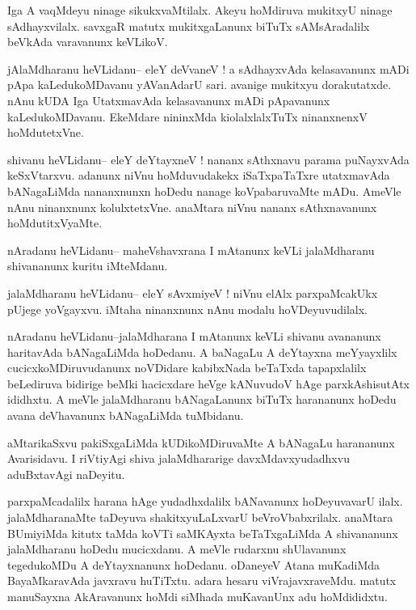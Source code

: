 \documentclass{article}
\begin{document}
\begin{mn}%
Iga A vaqMdeyu ninage sikukxvaMtilalx. Akeyu hoMdiruva mukitxyU ninage sAdhayxvilalx. 
savxgaR matutx mukitxgaLanunx biTuTx sAMsAradalilx beVkAda varavanunx keVLikoV.
\end{mn}

\begin{mn}%
jAlaMdharanu heVLidanu-- eleY deVvaneV ! a sAdhayxvAda kelasavanunx mADi pApa 
kaLedukoMDavanu yAVanAdarU sari. avanige mukitxyu dorakutatxde. nAnu kUDA Iga UtatxmavAda 
kelasavanunx mADi pApavanunx kaLedukoMDavanu. EkeMdare nininxMda kiolalxlalxTuTx 
ninanxnenxV hoMdutetxVne.
\end{mn}

\begin{mn}%
shivanu heVLidanu-- eleY deYtayxneV ! nananx sAthxnavu parama puNayxvAda keSxVtarxvu. 
adanunx niVnu hoMduvudakekx iSaTxpaTaTxre utatxmavAda bANagaLiMda nananxnunxn hoDedu nanage 
koVpabaruvaMte mADu. AmeVle nAnu ninanxnunx kolulxtetxVne. anaMtara niVnu nananx 
sAthxnavanunx hoMdutitxVyaMte.
\end{mn}

\begin{mn}%
nAradanu heVLidanu-- maheVshavxrana I mAtanunx keVLi jalaMdharanu shivananunx kuritu iMteMdanu.
\end{mn}

\begin{mn}%
jalaMdharanu heVLidanu-- eleY sAvxmiyeV ! niVnu elAlx parxpaMcakUkx pUjege yoVgayxvu. iMtaha 
ninanxnunx nAnu modalu hoVDeyuvudilalx.
\end{mn}

\begin{mn}%
nAradanu heVLidanu--jalaMdharana I mAtanunx keVLi shivanu avananunx haritavAda bANagaLiMda 
hoDedanu. A baNagaLu A deYtayxna meYyayxlilx cucicxkoMDiruvudanunx noVDidare kabibxNada 
beTaTxda tapapxlalilx beLediruva bidirige beMki hacicxdare heVge kANuvudoV hAge 
parxkAshisutAtx ididhxtu. A meVle jalaMdharanu bANagaLanunx biTuTx harananunx hoDedu avana 
deVhavanunx bANagaLiMda tuMbidanu.
\end{mn}

\begin{mn}%
aMtarikaSxvu pakiSxgaLiMda kUDikoMDiruvaMte A bANagaLu harananunx Avarisidavu. I riVtiyAgi 
shiva jalaMdhararige davxMdavxyudadhxvu aduBxtavAgi naDeyitu.
\end{mn}

\begin{mn}%
parxpaMcadalilx harana hAge yudadhxdalilx bANavanunx hoDeyuvavarU ilalx. jalaMdharanaMte 
taDeyuva shakitxyuLaLxvarU beVroVbabxrilalx. anaMtara BUmiyiMda kitutx taMda koVTi 
saMKAyxta beTaTxgaLiMda A shivananunx jalaMdharanu hoDedu mucicxdanu. A meVle rudarxnu 
shUlavanunx tegedukoMDu A deYtayxnanunx hoDedanu. oDaneyeV Atana muKadiMda BayaMkaravAda 
javxravu huTiTxtu. adara hesaru viVrajavxraveMdu. matutx manuSayxna AkAravanunx hoMdi 
siMhada muKavanUnx adu hoMdididxtu.
\end{mn}
\end{document}
